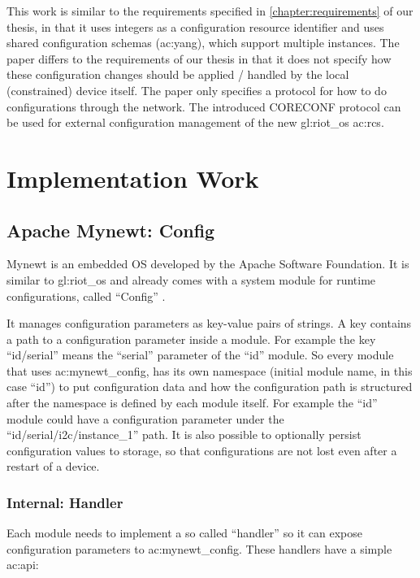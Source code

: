 This work is similar to the requirements specified in \autoref{chapter:requirements} of our thesis, in that it uses integers as a configuration resource identifier and uses shared configuration schemas (\acrshort{ac:yang}), which support multiple instances.
The paper differs to the requirements of our thesis in that it does not specify how these configuration changes should be applied / handled by the local (constrained) device itself.
The paper only specifies a protocol for how to do configurations through the network.
The introduced CORECONF protocol can be used for external configuration management of the new \gls{gl:riot_os} \gls{ac:rcs}.

\section{Implementation Work}

\subsection{Apache Mynewt: Config}
\label{sec:analysis:related_work:mynewt_config}

Mynewt is an embedded OS developed by the Apache Software Foundation.
It is similar to \gls{gl:riot_os} and already comes with a system module for runtime configurations, called ``Config'' \cite{apache-mynewt-20}.

It manages configuration parameters as key-value pairs of strings.
A key contains a path to a configuration parameter inside a module.
For example the key ``id/serial'' means the ``serial'' parameter of the ``id'' module.
So every module that uses \gls{ac:mynewt_config}, has its own namespace (initial module name, in this case ``id'') to put configuration data and how the configuration path is structured after the namespace is defined by each module itself.
For example the ``id'' module could have a configuration parameter under the ``id/serial/i2c/instance\_1'' path.
It is also possible to optionally persist configuration values to storage, so that configurations are not lost even after a restart of a device.

\subsubsection{Internal: Handler}

Each module needs to implement a so called ``handler'' so it can expose configuration parameters to \gls{ac:mynewt_config}.
These handlers have a simple \gls{ac:api}:

